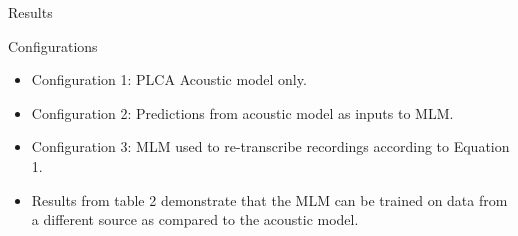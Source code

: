 \documentclass[final]{beamer}
\newlength{\onecolwid}
\newlength{\twocolwid}
\begin{document}
\begin{frame}[t]
\begin{columns}[t]
\begin{column}{\twocolwid}
\begin{columns}[t,totalwidth=\twocolwid]
\begin{column}{\onecolwid}
\begin{block}{Results}
\begin{alertblock}{Configurations}
\begin{itemize}
\item Configuration 1: PLCA Acoustic model only. \\
\item Configuration 2: Predictions from acoustic model as inputs to MLM. 
\item Configuration 3: MLM used to re-transcribe recordings according to Equation 1.
\end{itemize}
\end{alertblock}
\begin{itemize}
 \item Results from table 2 demonstrate that the MLM can be trained on data from a different source as compared to the acoustic model.
\end{itemize}


\end{block}



\end{column} %

\end{columns} %







\end{column}
\end{columns}
\end{frame}
\end{document}
